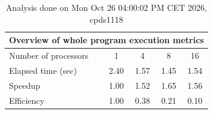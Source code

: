 \begin{table}[h]
\begin{center}
\begin{tabular}{|l|c|c|c|c|}
\hline
\multicolumn{5}{|c|}{Overview of whole program execution metrics} \\
\hline
\hline
Number of processors & 1 & 4 & 8 & 16 \\
\hline
Elapsed time (sec)      &       2.40 &       1.57 &       1.45 &       1.54 \\
\hline
Speedup                 &       1.00 &       1.52 &       1.65 &       1.56 \\
\hline
Efficiency              &       1.00 &       0.38 &       0.21 &       0.10 \\
\hline
\end{tabular}
\end{center}
\caption{ Analysis done on Mon Oct 26 04:00:02 PM CET 2026, cpds1118}
\end{table}
